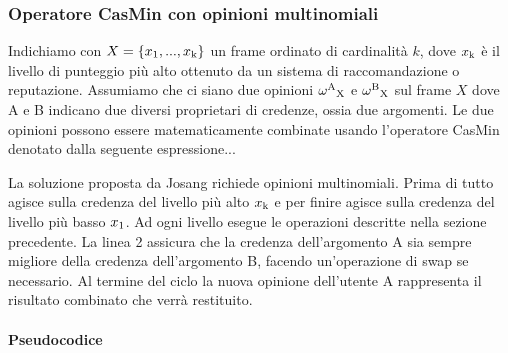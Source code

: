 \documentclass{report}
\newcommand{\myparagraph}[1]{\paragraph{#1}\mbox{} \mbox{}}
\begin{document}
	\hypertarget{header-n151}{%
		\subsubsection{Operatore CasMin con opinioni
			multinomiali}\label{header-n151}}
	
	Indichiamo con $X=\{x\textsubscript{1} ,...,x\textsubscript{k}\}$ un frame
	ordinato di cardinalità $k$, dove $x\textsubscript{k}$ è il livello di punteggio più alto
	ottenuto da un sistema di raccomandazione o reputazione. Assumiamo che
	ci siano due opinioni $\omega\textsuperscript{A}\textsubscript{X}$ e $\omega\textsuperscript{B}\textsubscript{X}$ sul frame $X$ dove A e B indicano
	due diversi proprietari di credenze, ossia due argomenti. Le due
	opinioni possono essere matematicamente combinate usando l'operatore
	CasMin denotato dalla seguente espressione...
	
	La soluzione proposta da Josang richiede opinioni multinomiali. Prima di
	tutto agisce sulla credenza del livello più alto $x\textsubscript{k}$ e per finire agisce
	sulla credenza del livello più basso $x\textsubscript{1}$. Ad ogni livello esegue le
	operazioni descritte nella sezione precedente. La linea 2 assicura che
	la credenza dell'argomento A sia sempre migliore della credenza
	dell'argomento B, facendo un'operazione di swap se necessario. Al
	termine del ciclo la nuova opinione dell'utente A rappresenta il
	risultato combinato che verrà restituito.
	
	\hypertarget{header-n156}{%
		\myparagraph{Pseudocodice}\label{header-n156}}
	
\end{document}
